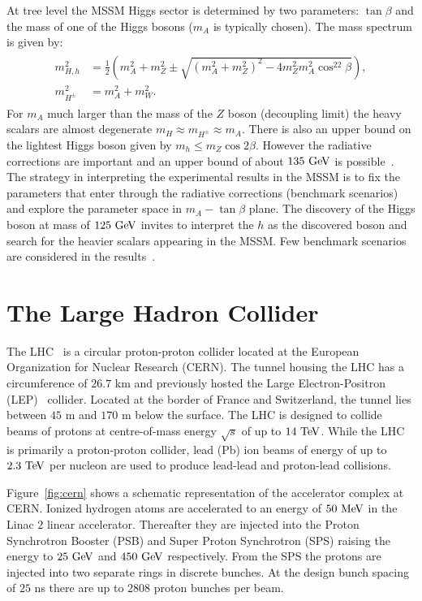 At tree level the MSSM Higgs sector is determined by two parameters: $\tan \beta$ and the mass of one of the Higgs bosons ($m_{A}$ is typically chosen). The mass spectrum is given by:
\begin{eqnarray} \label{eq:mssm_mass}
\begin{aligned}
m_{H,h}^2 &= \frac{1}{2} (m_A^2 + m_Z^2 \pm \sqrt{(m_A^2+m_Z^2)^2-4m_Z^2m_A^2\cos^22\beta}), \\
m_{H^{\pm}}^2 &= m_{A}^2 + m_{W}^2.
\end{aligned}
\end{eqnarray}   
For $m_{A}$ much larger than the mass of the $Z$ boson (decoupling limit) the heavy scalars are almost degenerate $m_{H} \approx m_{H^{\pm}} \approx m_{A}$. There is also an upper bound on the lightest Higgs boson given by $m_{h} \leq m_{Z} \cos 2\beta$. However the radiative corrections are important and an upper bound of about $135~\mathrm{Ge\kern -0.1em V}$ is possible~\cite{Degrassi:2002fi}. The strategy in interpreting the experimental results in the MSSM is to fix the parameters that enter through the radiative corrections (benchmark scenarios) and explore the parameter space in $m_{A}-\tan \beta$ plane. The discovery of the Higgs boson at mass of $125~\mathrm{Ge\kern -0.1em V}$ invites to interpret the $h$ as the discovered boson and search for the heavier scalars appearing in the MSSM. Few benchmark scenarios are considered in the results~\cite{Heinemeyer:2011aa,Carena:2013ytb}.

\section{The Large Hadron Collider}
The LHC~\cite{1748-0221-3-08-S08001} is a circular proton-proton collider located at the European Organization for Nuclear Research (CERN). The tunnel housing the LHC has a circumference of $26.7$ km and previously hosted the Large Electron-Positron (LEP)~\cite{lep1,lep2} collider. Located at the border of France and Switzerland, the tunnel lies between $45$ m and $170$ m below the surface. The LHC is designed to collide beams of protons at centre-of-mass energy $\sqrt{s}$ of up to $14~\mathrm{Te\kern -0.1em V}$. While the LHC is primarily a proton-proton collider, lead (Pb) ion beams of energy of up to $2.3~\mathrm{Te\kern -0.1em V}$ per nucleon are used to produce lead-lead  and proton-lead collisions.  
 
Figure~\ref{fig:cern} shows a schematic representation of the accelerator complex at CERN. Ionized hydrogen atoms are accelerated to an energy of $50~\mathrm{Me\kern -0.1em V}$ in the Linac $2$ linear accelerator. Thereafter they are injected into the Proton Synchrotron Booster (PSB) and Super Proton Synchrotron (SPS) raising the energy to $25~\mathrm{Ge\kern -0.1em V}$ and $450~\mathrm{Ge\kern -0.1em V}$ respectively. From the SPS the protons are injected into two separate rings in discrete bunches. At the design bunch spacing of $25$ ns there are up to $2808$ proton bunches per beam. 

